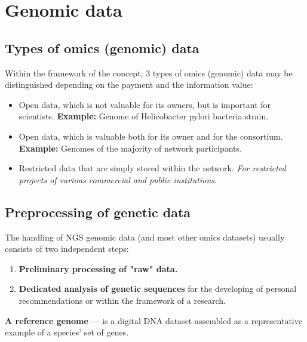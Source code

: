 \section{Genomic data}
\subsection{Types of omics (genomic) data}

Within the framework of the concept, 3 types of omics (genomic) data may be distinguished depending on the payment and the information value:

\begin{itemize}

  \item Open data, which is not valuable for its owners, but is important for scientists.
  \newline\textbf{Example:} Genome of Helicobacter pylori bacteria strain.

  \item Open data, which is valuable both for its owner and for the consortium.
  \newline\textbf{Example:} Genomes of the majority of network participants.

  \item Restricted data that are simply stored within the network.
  \newline\textit{For restricted projects of various commercial and public institutions.}

\end{itemize}



\subsection{Preprocessing of genetic data}
The handling of NGS genomic data (and most other omics datasets) usually consists of two independent steps:
\begin{enumerate}
\item  \textbf{Preliminary processing of "raw" data.}
\item  \textbf{Dedicated analysis of genetic sequences} for the developing of personal recommendations or within the framework of a research.
\end{enumerate}

\begin{note}
  \textbf{A reference genome} --- is a digital DNA dataset assembled as a representative example of a species' set of genes.
\end{note}

